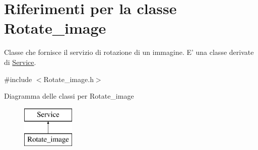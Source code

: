 \hypertarget{class_rotate__image}{\section{Riferimenti per la classe Rotate\-\_\-image}
\label{class_rotate__image}
}


Classe che fornisce il servizio di rotazione di un immagine. E' una classe derivate di {\ttfamily \hyperlink{class_service}{Service}}.  




{\ttfamily \#include $<$Rotate\-\_\-image.\-h$>$}

Diagramma delle classi per Rotate\-\_\-image\begin{figure}[H]
\begin{center}
\leavevmode
\includegraphics[height=2.000000cm]{class_rotate__image}
\end{center}
\end{figure}
